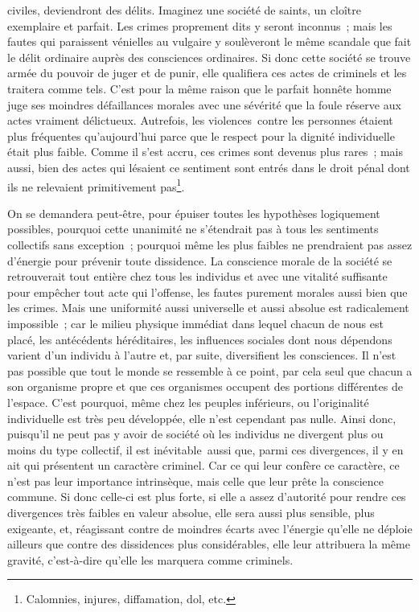 \documentclass[french,twoside]{book} %
\begin{document}
civiles, deviendront des délits. Imaginez une société de saints, un cloître exemplaire et parfait. Les crimes proprement dits y seront inconnus ; mais les fautes qui paraissent vénielles au vulgaire y soulèveront le même scandale que fait le délit ordinaire auprès des consciences ordinaires. Si donc cette société se trouve armée du pouvoir de juger et de punir, elle qualifiera ces actes de criminels et les traitera comme tels. C’est pour la même raison que le parfait honnête homme juge ses moindres défaillances morales avec une sévérité que la foule réserve aux actes vraiment délictueux. Autrefois, les violences contre les personnes étaient plus fréquentes qu’aujourd’hui parce que le respect pour la dignité individuelle était plus faible. Comme il s’est accru, ces crimes sont devenus plus rares ; mais aussi, bien des actes qui lésaient ce sentiment sont entrés dans le droit pénal dont ils ne relevaient primitivement pas\footnote{ Calomnies, injures, diffamation, dol, etc.}.\par
On se demandera peut-être, pour épuiser toutes les hypothèses logiquement possibles, pourquoi cette unanimité ne s’étendrait pas à tous les sentiments collectifs sans exception ; pourquoi même les plus faibles ne prendraient pas assez d’énergie pour prévenir toute dissidence. La conscience morale de la société se retrouverait tout entière chez tous les individus et avec une vitalité suffisante pour empêcher tout acte qui l’offense, les fautes purement morales aussi bien que les crimes. Mais une uniformité aussi universelle et aussi absolue est radicalement impossible ; car le milieu physique immédiat dans lequel chacun de nous est placé, les antécédents héréditaires, les influences sociales dont nous dépendons varient d’un individu à l’autre et, par suite, diversifient les consciences. Il n’est pas possible que tout le monde se ressemble à ce point, par cela seul que chacun a son organisme propre et que ces organismes occupent des portions différentes de l’espace. C’est pourquoi, même chez les peuples inférieurs, ou l’originalité individuelle est très peu développée, elle n’est cependant pas nulle. Ainsi donc, puisqu’il ne peut pas y avoir de société où les individus ne divergent plus ou moins du type collectif, il est inévitable aussi que, parmi ces divergences, il y en ait qui présentent un caractère criminel. Car ce qui leur confère ce caractère, ce n’est pas leur importance intrinsèque, mais celle que leur prête la conscience commune. Si donc celle-ci est plus forte, si elle a assez d’autorité pour rendre ces divergences très faibles en valeur absolue, elle sera aussi plus sensible, plus exigeante, et, réagissant contre de moindres écarts avec l’énergie qu’elle ne déploie ailleurs que contre des dissidences plus considérables, elle leur attribuera la même gravité, c’est-à-dire qu’elle les marquera comme criminels.\par
\end{document}
